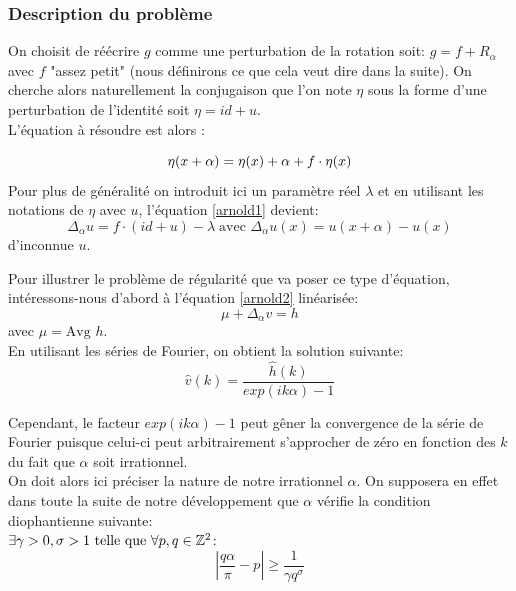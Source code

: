 \documentclass[11pt,a4paper]{article}
\begin{document}
\subsubsection{Description du problème}
On choisit de réécrire $g$ comme une perturbation de la rotation soit: $g= f + R_\alpha$ avec $f$ "assez petit" (nous définirons ce que cela veut dire dans la suite). On cherche alors naturellement la conjugaison que l'on note $\eta$ sous la forme d'une perturbation de l'identité soit $\eta=id+u$. \\
L'équation à résoudre est alors :

\begin{equation}\label{arnold1}
\eta(x + \alpha)= \eta(x) + \alpha + f \cdot \eta(x) \\
\end{equation}
Pour plus de généralité on introduit ici un paramètre réel $\lambda$ et en utilisant les notations de $\eta$ avec $u$, l'équation \eqref{arnold1} devient:
\begin{equation}\label{arnold2}
\Delta_\alpha u= f \cdot (id +u) - \lambda \; \text{avec  } \Delta_\alpha u(x)= u(x+\alpha) - u(x)
\end{equation}
d'inconnue $u$.
\par Pour illustrer le problème de régularité que va poser ce type d'équation, intéressons-nous d'abord à l'équation \eqref{arnold2} linéarisée:
\begin{equation}\label{arnold3}
\mu + \Delta_\alpha v = h 
\end{equation}
avec $\mu= \text{Avg } h$. \\
En utilisant les séries de Fourier, on obtient la solution suivante:
\begin{equation*}
\hat{v}(k)=\frac{\hat{h}(k)}{exp(ik \alpha) - 1}
\end{equation*}

Cependant, le facteur $exp(ik \alpha) - 1$ peut gêner la convergence de la série de Fourier puisque celui-ci peut arbitrairement s'approcher de zéro en fonction des $k$ du fait que $\alpha$ soit irrationnel. \\
On doit alors ici préciser la nature de notre irrationnel $\alpha$. On supposera en effet dans toute la suite de notre développement que $\alpha$ vérifie la condition diophantienne suivante: \\
 $ \exists \gamma>0,\sigma>1 \ \text{telle que} \ \forall p,q \in \mathbb Z^2 $:
\begin{equation}
|\frac{q \alpha}{\pi}-p|\geq \frac{1}{\gamma q^\sigma}
\end{equation} 
\end{document}
